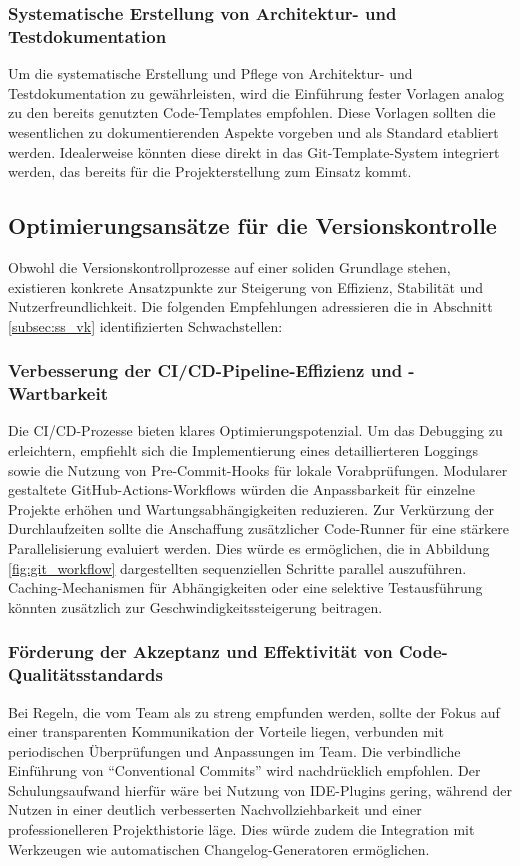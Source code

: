 \documentclass[12pt,oneside]{article}
\begin{document}
    \subsubsection{Systematische Erstellung von Architektur- und Testdokumentation}
    \label{subsubsec:doku_architektur_test}
    Um die systematische Erstellung und Pflege von Architektur- und Testdokumentation zu gewährleisten, wird die Einführung fester Vorlagen analog zu den bereits genutzten Code-Templates empfohlen. Diese Vorlagen sollten die wesentlichen zu dokumentierenden Aspekte vorgeben und als Standard etabliert werden. Idealerweise könnten diese direkt in das Git-Template-System integriert werden, das bereits für die Projekterstellung zum Einsatz kommt.

    \subsection{Optimierungsansätze für die Versionskontrolle}
    \label{subsec:konzepte_vk}
    Obwohl die Versionskontrollprozesse auf einer soliden Grundlage stehen, existieren konkrete Ansatzpunkte zur Steigerung von Effizienz, Stabilität und Nutzerfreundlichkeit. Die folgenden Empfehlungen adressieren die in Abschnitt \ref{subsec:ss_vk} identifizierten Schwachstellen:

    \subsubsection{Verbesserung der CI/CD-Pipeline-Effizienz und -Wartbarkeit}
    \label{subsubsec:vk_cicd_optimierung}
    Die CI/CD-Prozesse bieten klares Optimierungspotenzial. Um das Debugging zu erleichtern, empfiehlt sich die Implementierung eines detaillierteren Loggings sowie die Nutzung von Pre-Commit-Hooks für lokale Vorabprüfungen. Modularer gestaltete GitHub-Actions-Workflows würden die Anpassbarkeit für einzelne Projekte erhöhen und Wartungsabhängigkeiten reduzieren. Zur Verkürzung der Durchlaufzeiten sollte die Anschaffung zusätzlicher Code-Runner für eine stärkere Parallelisierung evaluiert werden. Dies würde es ermöglichen, die in Abbildung \ref{fig:git_workflow} dargestellten sequenziellen Schritte parallel auszuführen. Caching-Mechanismen für Abhängigkeiten oder eine selektive Testausführung könnten zusätzlich zur Geschwindigkeitssteigerung beitragen.

    \subsubsection{Förderung der Akzeptanz und Effektivität von Code-Qualitätsstandards}
    \label{subsubsec:vk_code_qualitaet}
    Bei Regeln, die vom Team als zu streng empfunden werden, sollte der Fokus auf einer transparenten Kommunikation der Vorteile liegen, verbunden mit periodischen Überprüfungen und Anpassungen im Team. Die verbindliche Einführung von ``Conventional Commits'' \cite{ConventionalCommitsOrgDe} wird nachdrücklich empfohlen. Der Schulungsaufwand hierfür wäre bei Nutzung von IDE-Plugins gering, während der Nutzen in einer deutlich verbesserten Nachvollziehbarkeit und einer professionelleren Projekthistorie läge. Dies würde zudem die Integration mit Werkzeugen wie automatischen Changelog-Generatoren ermöglichen.
\end{document}
